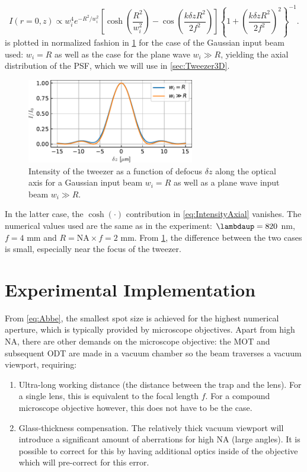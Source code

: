 \begin{equation}\label{eq:IntensityAxial}
	I(r=0,z) \propto w_i^4 e^{-R^2/w_i^2}\left[
	\cosh\left(\frac{R^2}{w_i^2}\right)-\cos\left(\frac{k \delta z R^2}{2f^2}\right)
	\right]
	\left\{
	1+\left(\frac{k\delta z R^2}{2 f^2}\right)^2
	\right\}^{-1}.
\end{equation}
 is plotted in normalized fashion in \cref{fig:PSFvsLongitudinal} for the case of the Gaussian input beam used: $w_i = R$ as well as the case for the plane wave $w_i \gg R$, yielding the axial distribution of the \ac{PSF}, which we will use in \cref{sec:Tweezer3D}.
\begin{figure}
	\centering
	\includegraphics[width=0.65\textwidth]{figures/LongitudinalTweezerField.pdf}
	\caption{Intensity of the tweezer as a function of defocus $\delta z$ along the optical axis for a Gaussian input beam $w_i = R$ as well as a plane wave input beam $w_i \gg R$.}
	\label{fig:PSFvsLongitudinal}
\end{figure}
In the latter case, the $\cosh(\cdot)$ contribution in \cref{eq:IntensityAxial} vanishes.
The numerical values used are the same as in the experiment: $\lambdaup= 820$ nm, $f=4$ mm and $R = \text{NA} \times f = 2$ mm.
From \cref{fig:PSFvsLongitudinal}, the difference between the two cases is small, especially near the focus of the tweezer.


\section{Experimental Implementation}\label{sec:MeasuringTweezer}

From \cref{eq:Abbe}, the smallest spot size is achieved for the highest numerical aperture, which is typically provided by microscope objectives. 
Apart from high NA, there are other demands on the microscope objective: the \ac{MOT} and subsequent \ac{ODT} are made in a vacuum chamber so the beam traverses a vacuum viewport, requiring:

\begin{enumerate}
	\item Ultra-long working distance (the distance between the trap and the lens). For a single lens, this is equivalent to the focal length $f$.
	For a compound microscope objective however, this does not have to be the case.
	
	\item Glass-thickness compensation. The relatively thick vacuum viewport will introduce a significant amount of aberrations for high NA (large angles). It is possible to correct for this by having additional optics inside of the objective which will pre-correct for this error.
\end{enumerate}


